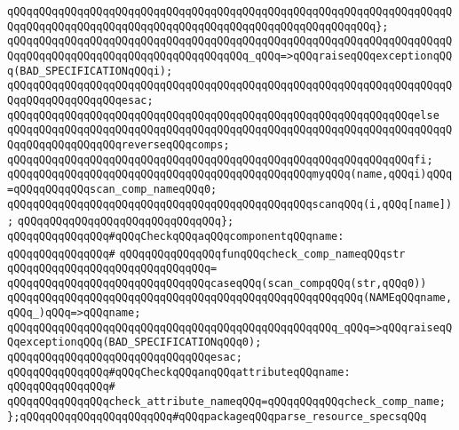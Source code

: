 \verb|qQQqqQQqqQQqqQQqqQQqqQQqqQQqqQQqqQQqqQQqqQQqqQQqqQQqqQQqqQQqqQQqqQQqqQQqqQQqqQQqqQQqqQQqqQQqqQQqqQQqqQQqqQQqqQQqqQQqqQQqqQQqqQQq};|\newline
\newline
\verb|qQQqqQQqqQQqqQQqqQQqqQQqqQQqqQQqqQQqqQQqqQQqqQQqqQQqqQQqqQQqqQQqqQQqqQQqqQQqqQQqqQQqqQQqqQQqqQQqqQQqqQQqqQQq_qQQq=>qQQqraiseqQQqexceptionqQQq(BAD_SPECIFICATIONqQQqi);|\newline
\verb|qQQqqQQqqQQqqQQqqQQqqQQqqQQqqQQqqQQqqQQqqQQqqQQqqQQqqQQqqQQqqQQqqQQqqQQqqQQqqQQqqQQqqQQqesac;|\newline
\verb|qQQqqQQqqQQqqQQqqQQqqQQqqQQqqQQqqQQqqQQqqQQqqQQqqQQqqQQqqQQqqQQqelse|\newline
\verb|qQQqqQQqqQQqqQQqqQQqqQQqqQQqqQQqqQQqqQQqqQQqqQQqqQQqqQQqqQQqqQQqqQQqqQQqqQQqqQQqqQQqqQQqreverseqQQqcomps;|\newline
\verb|qQQqqQQqqQQqqQQqqQQqqQQqqQQqqQQqqQQqqQQqqQQqqQQqqQQqqQQqqQQqqQQqfi;|\newline
\newline
\verb|qQQqqQQqqQQqqQQqqQQqqQQqqQQqqQQqqQQqqQQqqQQqqQQqmyqQQq(name,qQQqi)qQQq=qQQqqQQqqQQqscan_comp_nameqQQq0;|\newline
\newline
\verb|qQQqqQQqqQQqqQQqqQQqqQQqqQQqqQQqqQQqqQQqqQQqqQQqscanqQQq(i,qQQq[name]);|\newline
\verb|qQQqqQQqqQQqqQQqqQQqqQQqqQQqqQQq};|\newline
\newline
\verb|qQQqqQQqqQQqqQQq#qQQqCheckqQQqaqQQqcomponentqQQqname:|\newline
\verb|qQQqqQQqqQQqqQQq#|\newline
\verb|qQQqqQQqqQQqqQQqfunqQQqcheck_comp_nameqQQqstr|\newline
\verb|qQQqqQQqqQQqqQQqqQQqqQQqqQQqqQQq=|\newline
\verb|qQQqqQQqqQQqqQQqqQQqqQQqqQQqqQQqcaseqQQq(scan_compqQQq(str,qQQq0))|\newline
\verb|qQQqqQQqqQQqqQQqqQQqqQQqqQQqqQQqqQQqqQQqqQQqqQQqqQQqqQQq(NAMEqQQqname,qQQq_)qQQq=>qQQqname;|\newline
\verb|qQQqqQQqqQQqqQQqqQQqqQQqqQQqqQQqqQQqqQQqqQQqqQQqqQQq_qQQq=>qQQqraiseqQQqexceptionqQQq(BAD_SPECIFICATIONqQQq0);|\newline
\verb|qQQqqQQqqQQqqQQqqQQqqQQqqQQqqQQqesac;|\newline
\newline
\verb|qQQqqQQqqQQqqQQq#qQQqCheckqQQqanqQQqattributeqQQqname:|\newline
\verb|qQQqqQQqqQQqqQQq#|\newline
\verb|qQQqqQQqqQQqqQQqcheck_attribute_nameqQQq=qQQqqQQqqQQqcheck_comp_name;|\newline
\newline
\verb|};qQQqqQQqqQQqqQQqqQQqqQQq#qQQqpackageqQQqparse_resource_specsqQQq|\newline
\newline

